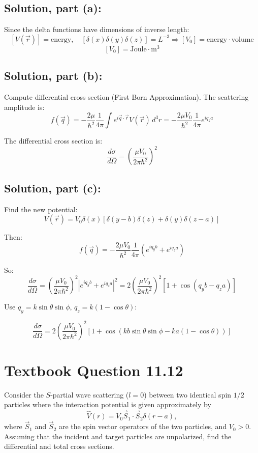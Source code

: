 \documentclass[12pt]{article}
\begin{document}
    \subsection{Solution, part (a):}
    Since the delta functions have dimensions of inverse length:
    \[
        [V(\vec{r})] = \text{energy}, \quad [\delta(x)\delta(y)\delta(z)] = L^{-3} \Rightarrow [V_0] = \text{energy} \cdot \text{volume}
    \]
    \[
        \boxed{[V_0] = \text{Joule} \cdot \text{m}^3}
    \]

    \subsection{Solution, part (b):}
    Compute differential cross section (First Born Approximation). The scattering amplitude is:
    \[
        f(\vec{q}) = -\frac{2\mu}{\hbar^2} \frac{1}{4\pi} \int e^{i \vec{q} \cdot \vec{r}} V(\vec{r}) \, d^3r
        = -\frac{2\mu V_0}{\hbar^2} \frac{1}{4\pi} e^{i q_z a}
    \]

    The differential cross section is:
    \[
        \boxed{
        \frac{d\sigma}{d\Omega} = \left( \frac{\mu V_0}{2\pi \hbar^2} \right)^2    }
    \]

    \subsection{Solution, part (c):}
        Find the new potential:
        \[
            V(\vec{r}) = V_0 \delta(x)\left[ \delta(y - b)\delta(z) + \delta(y)\delta(z - a) \right]
        \]
    
        Then:
        \[
            f(\vec{q}) = -\frac{2\mu V_0}{\hbar^2} \frac{1}{4\pi} \left( e^{i q_y b} + e^{i q_z a} \right)
        \]
    
        So:
        \[
            \frac{d\sigma}{d\Omega} = \left( \frac{\mu V_0}{2\pi \hbar^2} \right)^2 \left| e^{i q_y b} + e^{i q_z a} \right|^2
            = 2 \left( \frac{\mu V_0}{2\pi \hbar^2} \right)^2 \left[ 1 + \cos(q_y b - q_z a) \right]
        \]
    
        Use \( q_y = k \sin\theta \sin\phi \), \( q_z = k(1 - \cos\theta) \):
    
        \[
            \boxed{
            \frac{d\sigma}{d\Omega} = 2 \left( \frac{\mu V_0}{2\pi \hbar^2} \right)^2 \left[ 1 + \cos\left( k b \sin\theta \sin\phi - k a (1 - \cos\theta) \right) \right]        }
        \]


\section{Textbook Question 11.12}
    Consider the \( S \)-partial wave scattering (\( l = 0 \)) between two identical spin \( 1/2 \) particles where the interaction potential is given approximately by
    \[
        \hat{V}(r) = V_0 \vec{S}_1 \cdot \vec{S}_2 \delta(r - a),
    \]
    where \( \vec{S}_1 \) and \( \vec{S}_2 \) are the spin vector operators of the two particles, and \( V_0 > 0 \). Assuming that the incident and target particles are unpolarized, find the differential and total cross sections.
\end{document}
